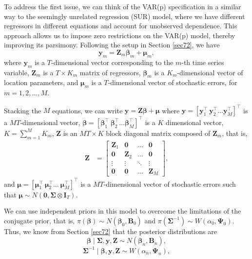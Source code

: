 To address the first issue, we can think of the VAR(p) specification in a similar way to the seemingly unrelated regression (SUR) model, where we have different regressors in different equations and account for unobserved dependence. This approach allows us to impose zero restrictions on the VAR(p) model, thereby improving its parsimony. Following the setup in Section \ref{sec72}, we have
\[
\bm{y}_{m} = \bm{Z}_{m} \bm{\beta}_m + \bm{\mu}_m,
\]
where $\bm{y}_m$ is a $T$-dimensional vector corresponding to the $m$-th time series variable, $\bm{Z}_m$ is a $T \times K_m$ matrix of regressors, $\bm{\beta}_m$ is a $K_m$-dimensional vector of location parameters, and $\bm{\mu}_m$ is a $T$-dimensional vector of stochastic errors, for $m = 1, 2, \dots, M$.

Stacking the $M$ equations, we can write $\bm{y}=\bm{Z}\bm{\beta}+\bm{\mu}$ where $\bm{y}=\left[\bm{y}_{1}^{\top} \ \bm{y}_{2}^{\top} \dots \bm{y}_{M}^{\top}\right]^{\top}$ is a $MT$-dimensional vector,  $\bm{\beta}=\left[\bm{\beta}_{1}^{\top} \ \bm{\beta}_{2}^{\top} \ldots \bm{\beta}_{M}^{\top}\right]^{\top}$ is a $ K$ dimensional vector, $K=\sum_{m=1}^{M} K_m$, $\bm{Z}$ is an $MT\times K$ block diagonal matrix composed of $\bm{Z}_{m}$, that is,
\begin{align*}
	\bm{Z}&=\begin{bmatrix}
		\bm{Z}_1 & \bm{0} & \dots & \bm{0}\\
		\bm{0} & \bm{Z}_2 & \dots & \bm{0}\\
		\vdots & \vdots & \ddots & \vdots\\
		\bm{0} & \bm{0} & \dots & \bm{Z}_M		
	\end{bmatrix},
\end{align*}
and $\bm{\mu}=\left[\bm{\mu}_{1}^{\top} \ \bm{\mu}_{2}^{\top} \dots \ \bm{\mu}_{M}^{\top}\right]^{\top}$ is a $MT$-dimensional vector of stochastic errors such that $\bm{\mu}\sim{N}(\bm{0},\bm{\Sigma}\otimes \bm{I}_T)$.

We can use independent priors in this model to overcome the limitations of the conjugate prior, that is, $\pi(\bm{\beta})\sim{N}(\bm{\beta}_0,\bm{B}_0)$ and $\pi(\bm{\Sigma}^{-1})\sim{W}(\alpha_0,\bm{\Psi}_0)$. Thus, we know from Section \ref{sec72} that the posterior distributions are
\begin{equation*}
	\bm{\beta}\mid \bm{\Sigma}, \bm{y}, \bm{Z} \sim {N}(\bm{\beta}_n, \bm{B}_n), 
\end{equation*}
\begin{equation*}
	\bm{\Sigma}^{-1}\mid \bm{\beta}, \bm{y}, \bm{Z} \sim {W}(\alpha_n, \bm{\Psi}_n),
\end{equation*}

